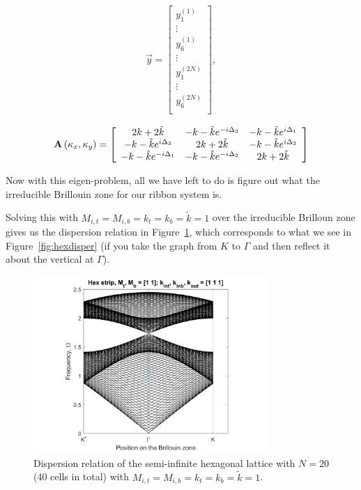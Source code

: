 \begin{align}
\vec{y}=\left[
\begin{array}{c}
y_1^{(1)}\\
\vdots\\
y_6^{(1)}\\
\vdots\\
y_1^{(2N)}\\
\vdots\\
y_6^{(2N)}\\
\end{array}\right],
\end{align}

\begin{align}
  \mathbf{A}\left(\kappa_{x},\kappa_{y}\right)=\left[
\begin{array}{ccc}
2k+2\tilde{k} & -k-\tilde{k}e^{-i\Delta_3} & -k-\tilde{k}e^{i\Delta_1} \\
-k-\tilde{k}e^{i\Delta_3} & 2k+2\tilde{k} & -k-\tilde{k}e^{i\Delta_2} \\
-k-\tilde{k}e^{-i\Delta_1} & -k-\tilde{k}e^{-i\Delta_2} & 2k+2\tilde{k} 
\end{array}\right]
\end{align}

Now with this eigen-problem, all we have left to do is figure out what the
irreducible Brillouin zone for our ribbon system is.

Solving this with $M_{i,t}=M_{i,b}=k_t=k_b=\tilde{k}=1$ over the irreducible
Brilloun zone gives us the dispersion relation in
Figure~\ref{fig:hexstripdisper}, which corresponds to what we see in
Figure~\ref{fig:hexdisper} (if you take the graph from $K$ to $\Gamma$ and then
reflect it about the vertical at $\Gamma$).

\begin{figure}[!h]
\centering
\includegraphics[width=0.8\textwidth]{imgs/hexstrip.png}
\caption{\label{fig:hexstripdisper} Dispersion relation of the semi-infinite
  hexagonal lattice with $N=20$ (40 cells in total) with
  $M_{i,t}=M_{i,b}=k_t=k_b=\tilde{k}=1$.}
\end{figure}

